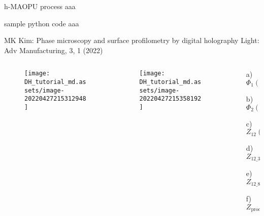 \documentclass[t, aspectratio=169]{beamer}
\begin{document}
\begin{frame}{h-MAOPU process}
aaa
\end{frame}


\begin{frame}{sample python code}
aaa
\end{frame}


\begin{frame}{MK Kim: Phase microscopy and surface profilometry by digital holography}
	\vspace{-3 mm}
	\small Light: Adv Manufacturing, 3, 1 (2022)
	\begin{columns}
		\begin{column}{.47\textwidth}
			\begin{figure}
				\texttt{[image: DH\_tutorial\_md.assets/image-20220427215312948]}
			\end{figure}
		\end{column}
		\begin{column}{.28\textwidth}
			\begin{figure}
				\texttt{[image: DH\_tutorial\_md.assets/image-20220427215358192]}
			\end{figure}
		\end{column}
		\begin{column}{.25\textwidth}
			\begin{itemize}
				\item[a) ] $ \Phi_1(x,y) $
				\item[b) ] $ \Phi_2(x,y) $
				\item[c) ] $ Z_{12}(x,y) $
				\item[d) ] $ Z_{12\_3}(x,y) $
				\item[e) ] $ Z_{12\_8}(x,y) $
				\item[f) ] $ Z_{\textrm{proc}}(x,y) $
			\end{itemize}
		\end{column}
	\end{columns}
\end{frame}
\end{document}
